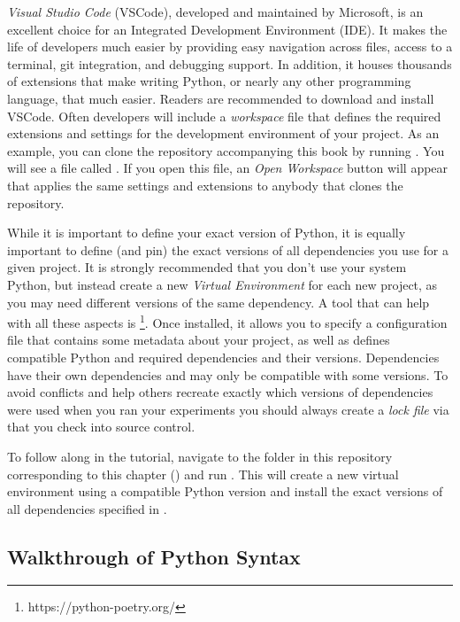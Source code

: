\textit{Visual Studio Code} (VSCode), developed and maintained by Microsoft, is an excellent choice for an Integrated Development Environment (IDE).
It makes the life of developers much easier by providing easy navigation across files, access to a terminal, git integration, and debugging support.
In addition, it houses thousands of extensions that make writing Python, or nearly any other programming language, that much easier.
Readers are recommended to download and install VSCode.
Often developers will include a \textit{workspace} file that defines the required extensions and settings for the development environment of your project.
As an example, you can clone the repository accompanying this book by running .
You will see a file called . 
If you open this file, an \textit{Open Workspace} button will appear that applies the same settings and extensions to anybody that clones the repository.

While it is important to define your exact version of Python, it is equally important to define (and pin) the exact versions of all dependencies you use for a given project.
It is strongly recommended that you don't use your system Python, but instead create a new \textit{Virtual Environment} for each new project, as you may need different versions of the same dependency. 
A tool that can help with all these aspects is \footnote{https://python-poetry.org/}. 
Once installed, it allows you to specify a  configuration file that contains some metadata about your project, as well as defines compatible Python and required dependencies and their versions.
Dependencies have their own dependencies and may only be compatible with some versions.
To avoid conflicts and help others recreate exactly which versions of dependencies were used when you ran your experiments you should always create a \textit{lock file} via  that you check into source control.

To follow along in the tutorial, navigate to the folder in this repository corresponding to this chapter () and run .
This will create a new virtual environment using a compatible Python version and install the exact versions of all dependencies specified in .

\subsection{Walkthrough of Python Syntax}

